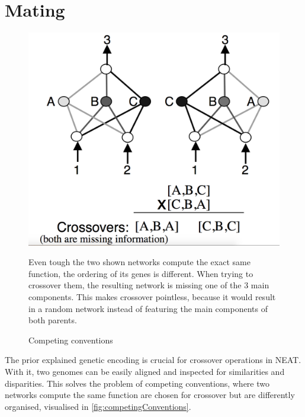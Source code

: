 \section{Mating}\label{sec:mating}
\begin{figure}[h]
	\centering
	\includegraphics[width=0.7\linewidth]{competingConventions}
	\caption{Competing conventions}
	\small
	Even tough the two shown networks compute the exact same function, the ordering of its genes is different. When trying to crossover them, the resulting network is missing one of the 3 main components. This makes crossover pointless, because it would result in a random network instead of featuring the main components of both parents. \cite{neat}
	\label{fig:crossover}
\end{figure}
The prior explained genetic encoding is crucial for crossover operations in NEAT. With it, two genomes can be easily aligned and inspected for similarities and disparities. This solves the problem of competing conventions, where two networks compute the same function are chosen for crossover but are differently organised, visualised in \autoref{fig:competingConventions}.  \\

